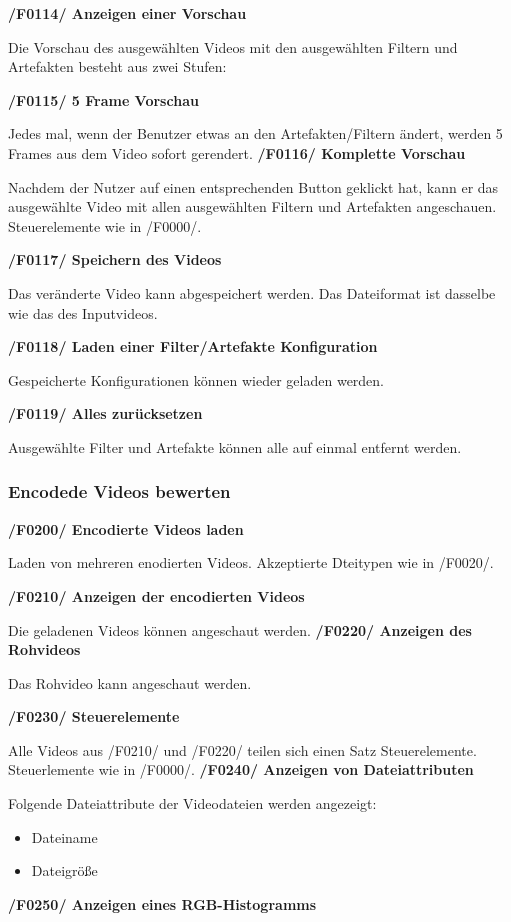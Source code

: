 \documentclass[parskip=full]{scrartcl}
\begin{document}
\textbf{/F0114/ Anzeigen einer Vorschau}

Die Vorschau des ausgewählten Videos mit den ausgewählten Filtern und Artefakten besteht aus zwei Stufen:

\textbf{/F0115/ 5 Frame Vorschau}

Jedes mal, wenn der Benutzer etwas an den Artefakten/Filtern ändert, werden 5 Frames aus dem Video sofort gerendert.
\newpage
\textbf{/F0116/ Komplette Vorschau}

Nachdem der Nutzer auf einen entsprechenden Button geklickt hat, kann er das ausgewählte Video mit allen ausgewählten Filtern und Artefakten angeschauen. Steuerelemente wie in /F0000/.

\textbf{/F0117/ Speichern des Videos}

Das veränderte Video kann abgespeichert werden. Das Dateiformat ist dasselbe wie das des Inputvideos.

\textbf{/F0118/ Laden einer Filter/Artefakte Konfiguration}

Gespeicherte Konfigurationen können wieder geladen werden.

\textbf{/F0119/ Alles zurücksetzen}

Ausgewählte Filter und Artefakte können alle auf einmal entfernt werden.
\subsubsection{Encodede Videos bewerten}
\textbf{/F0200/ Encodierte Videos laden}

Laden von mehreren enodierten Videos. Akzeptierte Dteitypen wie in /F0020/.

\textbf{/F0210/ Anzeigen der encodierten Videos}

Die geladenen Videos können angeschaut werden.
\textbf{/F0220/ Anzeigen des Rohvideos}

Das Rohvideo kann angeschaut werden.

\textbf{/F0230/ Steuerelemente}

Alle Videos aus /F0210/ und /F0220/ teilen sich einen Satz Steuerelemente. Steuerlemente wie in /F0000/.
\newpage
\textbf{/F0240/ Anzeigen von Dateiattributen}

Folgende Dateiattribute der Videodateien werden angezeigt:
\begin{itemize}
\item Dateiname
\item Dateigröße
\end{itemize}

\textbf{/F0250/ Anzeigen eines RGB-Histogramms}
\end{document}
